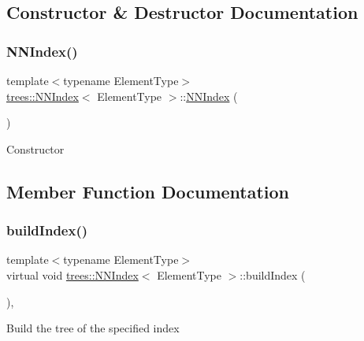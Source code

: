 \subsection{Constructor \& Destructor Documentation}
\mbox{\label{classtrees_1_1_n_n_index_ae314d8a7c8c0db0eaf22b667b4b4a14e}} 
\subsubsection{\texorpdfstring{N\+N\+Index()}{NNIndex()}}
{\footnotesize\ttfamily template$<$typename Element\+Type$>$ \\
\hyperlink{classtrees_1_1_n_n_index}{trees\+::\+N\+N\+Index}$<$ Element\+Type $>$\+::\hyperlink{classtrees_1_1_n_n_index}{N\+N\+Index} (\begin{DoxyParamCaption}{ }\end{DoxyParamCaption})\hspace{0.3cm}{\ttfamily [inline]}}

Constructor 

\subsection{Member Function Documentation}
\mbox{\label{classtrees_1_1_n_n_index_ad8db1182322eba8c1f68ce250e45a36c}} 
\subsubsection{\texorpdfstring{build\+Index()}{buildIndex()}}
{\footnotesize\ttfamily template$<$typename Element\+Type$>$ \\
virtual void \hyperlink{classtrees_1_1_n_n_index}{trees\+::\+N\+N\+Index}$<$ Element\+Type $>$\+::build\+Index (\begin{DoxyParamCaption}{ }\end{DoxyParamCaption})\hspace{0.3cm}{\ttfamily [inline]}, {\ttfamily [virtual]}}

Build the tree of the specified index \mbox{\label{classtrees_1_1_n_n_index_a3a280e25b04449f34c4ed0fcc419e7b1}} 
